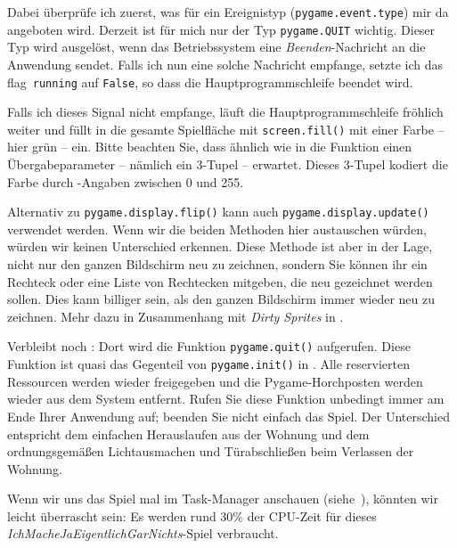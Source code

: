 Dabei überprüfe ich zuerst, was für ein Ereignistyp (\texttt{pygame.event.type}) mir da angeboten wird. Derzeit ist für mich nur der Typ \texttt{pygame.QUIT} wichtig. Dieser Typ wird ausgelöst, wenn das Betriebssystem eine \emph{Beenden}-Nachricht an die Anwendung sendet. Falls ich nun eine solche Nachricht empfange, setzte ich das \Gls{flag}\ \texttt{running} auf \texttt{False}, so dass die Hauptprogrammschleife beendet wird.

Falls ich dieses Signal nicht empfange, läuft die Hauptprogrammschleife fröhlich weiter und füllt in  die gesamte Spielfläche mit \texttt{screen.fill()} mit einer Farbe -- hier grün -- ein. Bitte beachten Sie, dass ähnlich wie in  die Funktion einen Übergabeparameter -- nämlich ein 3-Tupel -- erwartet. Dieses 3-Tupel kodiert die Farbe durch -Angaben zwischen 0 und 255.

Alternativ zu \texttt{pygame.display.flip()} kann auch \texttt{pygame.display.update()} verwendet werden. Wenn wir die beiden Methoden hier austauschen würden, würden wir keinen Unterschied erkennen. Diese Methode ist aber in der Lage, nicht nur den ganzen Bildschirm neu zu zeichnen, sondern Sie können ihr ein Rechteck oder eine Liste von Rechtecken mitgeben, die neu gezeichnet werden sollen. Dies kann billiger sein, als den ganzen Bildschirm immer wieder neu zu zeichnen. Mehr dazu in Zusammenhang mit \emph{Dirty Sprites} in .

Verbleibt noch : Dort wird die Funktion \texttt{pygame.quit()} aufgerufen. Diese Funktion ist quasi das Gegenteil von \texttt{pygame.init()} in . Alle reservierten Ressourcen werden wieder freigegeben und die Pygame-Horchposten werden wieder aus dem System entfernt. Rufen Sie diese Funktion unbedingt immer am Ende Ihrer Anwendung auf; beenden Sie nicht einfach das Spiel. Der Unterschied entspricht dem einfachen Herauslaufen aus der Wohnung und dem ordnungsgemäßen Lichtausmachen und Türabschließen beim Verlassen der Wohnung.  

Wenn wir uns das Spiel mal im Task-Manager anschauen (siehe~), könnten wir leicht überrascht sein: Es werden rund 30\% der CPU-Zeit für dieses \emph{IchMacheJaEigentlichGarNichts}-Spiel verbraucht. 

